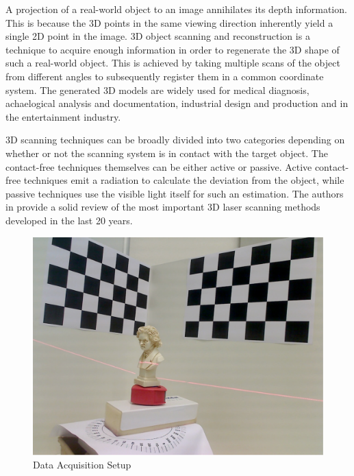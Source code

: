 A projection of a real-world object to an image annihilates its depth
information. This is because the 3D points in the same viewing direction
inherently yield a single 2D point in the image. 3D object scanning and
reconstruction is a technique to acquire enough information in order to
regenerate the 3D shape of such a real-world object. This is achieved by
taking multiple scans of the object from different angles to subsequently
register them in a common coordinate system. The generated 3D models are
widely used for medical diagnosis, achaelogical analysis and documentation,
industrial design and production and in the entertainment industry.

3D scanning techniques can be broadly divided into two categories depending on
whether or not the scanning system is in contact with the target object.  The
contact-free techniques themselves can be either active or passive. Active
contact-free techniques emit a radiation to calculate the deviation from the
object, while passive techniques use the visible light itself for such an
estimation. The authors in \cite{blaisf:2004} provide a solid review of the
most important 3D laser scanning methods developed in the last 20 years.

\begin{figure}[ht!]
\centering
\includegraphics[width=1.00\linewidth]{figures/introduction}
\caption{Data Acquisition Setup}
\label{figure:acquisition}
\end{figure}

